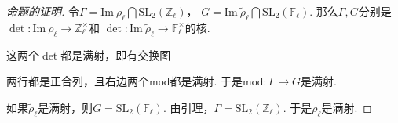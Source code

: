 \begin{proof}[命题的证明]
    令$\Gamma = \mathrm{Im}\ \rho_{\ell}\bigcap \mathrm{SL}_2(\mathbb{Z}_{\ell})$，
    $G = \mathrm{Im}\ \tilde{\rho}_{\ell}\bigcap \mathrm{SL}_2(\mathbb{F}_{\ell})$.
    那么$\Gamma, G$分别是$\det: \mathrm{Im}\ \rho_{\ell} \to \mathbb{Z}_{\ell}^{\times}$和
    $\det: \mathrm{Im}\ \tilde{\rho}_{\ell}\to \mathbb{F}_{\ell}^{\times}$的核.

    这两个$\det$都是满射，即有交换图
    \begin{figure}[H]
        \centering
    \end{figure}
    两行都是正合列，且右边两个$\mathrm{mod}$都是满射.
    于是$\mathrm{mod}:\Gamma\to G$是满射.
    
    如果$\tilde{\rho}_{\ell}$是满射，则$G = \mathrm{SL}_2(\mathbb{F}_{\ell})$. 由引理，$\Gamma = \mathrm{SL}_2(\mathbb{Z}_{\ell})$. 于是$\rho_{\ell}$是满射.
\end{proof}
